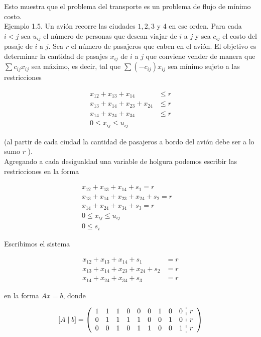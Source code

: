 \documentclass[10pt]{article}
\begin{document}
Esto muestra que el problema del transporte es un problema de flujo de mínimo costo.\\
Ejemplo 1.5. Un avión recorre las ciudades $1,2,3$ y 4 en ese orden. Para cada $i<j$ sea $u_{i j}$ el número de personas que desean viajar de $i$ a $j$ y sea $c_{i j}$ el costo del pasaje de $i$ a $j$. Sea $r$ el número de pasajeros que caben en el avión. El objetivo es determinar la cantidad de pasajes $x_{i j}$ de $i$ a $j$ que conviene vender de manera que $\sum c_{i j} x_{i j}$ sea máximo, es decir, tal que $\sum\left(-c_{i j}\right) x_{i j}$ sea mínimo sujeto a las restricciones

$$
\begin{aligned}
x_{12}+x_{13}+x_{14} & \leq r \\
x_{13}+x_{14}+x_{23}+x_{24} & \leq r \\
x_{14}+x_{24}+x_{34} & \leq r \\
0 \leq x_{i j} \leq u_{i j} &
\end{aligned}
$$

(al partir de cada ciudad la cantidad de pasajeros a bordo del avión debe ser a lo sumo $r$ ).\\
Agregando a cada desigualdad una variable de holgura podemos escribir las restricciones en la forma

$$
\begin{gathered}
x_{12}+x_{13}+x_{14}+s_{1}=r \\
x_{13}+x_{14}+x_{23}+x_{24}+s_{2}=r \\
x_{14}+x_{24}+x_{34}+s_{3}=r \\
0 \leq x_{i j} \leq u_{i j} \\
0 \leq s_{i}
\end{gathered} \quad
$$

Escribimos el sistema

$$
\begin{aligned}
x_{12}+x_{13}+x_{14}+s_{1} & =r \\
x_{13}+x_{14}+x_{23}+x_{24}+s_{2} & =r \\
x_{14}+x_{24}+x_{34}+s_{3} & =r
\end{aligned}
$$

en la forma $A x=b$, donde

$$
[A \mid b]=\left(\begin{array}{ccccccccc:c}
1 & 1 & 1 & 0 & 0 & 0 & 1 & 0 & 0 & r \\
0 & 1 & 1 & 1 & 1 & 0 & 0 & 1 & 0 & r \\
0 & 0 & 1 & 0 & 1 & 1 & 0 & 0 & 1 & r
\end{array}\right)
$$
\end{document}
